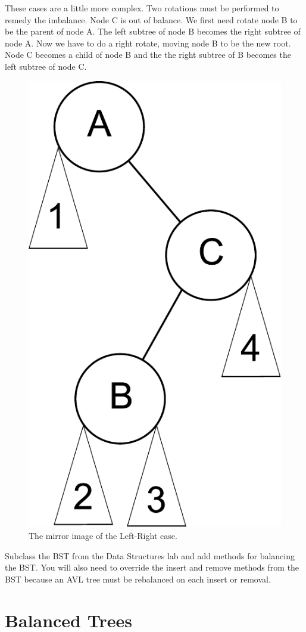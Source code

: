 These cases are a little more complex.
Two rotations must be performed to remedy the imbalance.
Node C is out of balance.
We first need rotate node B to be the parent of node A.
The left subtree of node B becomes the right subtree of node A.
Now we have to do a right rotate, moving node B to be the new root.
Node C becomes a child of node B and the the right subtree of B becomes the left subtree of node C.

\begin{figure}[h]
\centering
\includegraphics[width=.33\textwidth]{right_left.pdf}
\caption{The mirror image of the Left-Right case.}
\end{figure}

\begin{problem}
Subclass the BST from the Data Structures lab and add methods for balancing the BST.
You will also need to override the insert and remove methods from the BST because an AVL tree must be rebalanced on each insert or removal.
\end{problem}

\section*{Balanced Trees}
